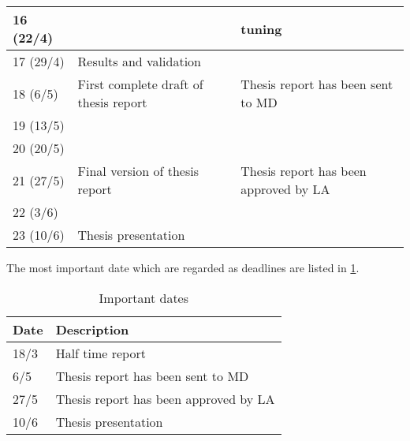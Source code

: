 \begin{table}[H]
\begin{tabular}{|p{}|p{}|p{}|}
	16 (22/4)            &                                       & tuning                                                                                                                                \\ \hline
	17 (29/4)            & Results and validation                &  \\ \hline
	18 (6/5)             & First complete draft of thesis report & Thesis report has been sent to MD                                                                                                     \\ \hline
	19 (13/5)            &                                       &  \\ \hline
	20 (20/5)            &                                       &  \\ \hline
	21 (27/5)            & Final version of thesis report        & Thesis report has been approved by LA                                                                                                 \\ \hline
	22 (3/6)             &                                       &  \\ \hline
	23 (10/6)            & Thesis presentation                   &  \\ \hline
\end{tabular}
\end{table}

The most important date which are regarded as deadlines are listed in \cref{table:dates}.


\begin{table}[H]
	\centering
	\caption{Important dates}
	\label{table:dates}
	\begin{tabular}{|p{}|p{}|}
		\hline
		\textbf{Date} & \textbf{Description}                  \\ \hline
		18/3          & Half time report                      \\ \hline
		6/5          & Thesis report has been sent to MD     \\ \hline
		27/5          & Thesis report has been approved by LA \\ \hline
		10/6          & Thesis presentation                   \\ \hline
	\end{tabular}
\end{table}



